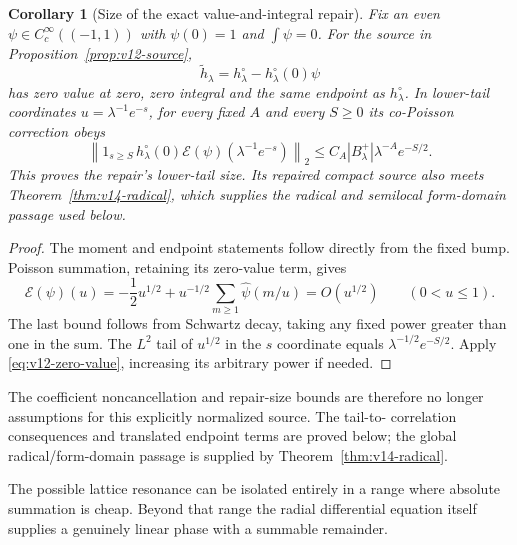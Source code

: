 \documentclass[11pt]{article}
\newtheorem{corollary}[theorem]{Corollary}
\theoremstyle{remark}
\begin{document}
\begin{corollary}[Size of the exact value-and-integral repair]
\label{cor:v12-repair}
Fix an even $\psi\in C_c^\infty((-1,1))$ with $\psi(0)=1$ and
$\int\psi=0$. For the source in Proposition~\ref{prop:v12-source},
\[
 \widetilde h_\lambda=h_\lambda^\circ-h_\lambda^\circ(0)\psi
\]
has zero value at zero, zero integral and the same endpoint as
$h_\lambda^\circ$. In lower-tail coordinates $u=\lambda^{-1}e^{-s}$,
for every fixed $A$ and every $S\ge0$ its co-Poisson correction obeys
\begin{equation}\label{eq:v12-repair-tail}
 \left\|1_{s\ge S}\,h_\lambda^\circ(0)
            \mathcal E(\psi)(\lambda^{-1}e^{-s})\right\|_2
     \le C_A |B_\lambda^+|\lambda^{-A}e^{-S/2}.
\end{equation}
This proves the repair's lower-tail size. Its repaired compact source
also meets Theorem~\ref{thm:v14-radical}, which supplies the radical and
semilocal form-domain passage used below.
\end{corollary}
\begin{proof}
The moment and endpoint statements follow directly from the fixed bump.
Poisson summation, retaining its zero-value term, gives
\[
 \mathcal E(\psi)(u)=-\frac12u^{1/2}
           +u^{-1/2}\sum_{m\ge1}\widehat\psi(m/u)=O(u^{1/2})
       \qquad(0<u\le1).
\]
The last bound follows from Schwartz decay, taking any fixed power
greater than one in the sum. The $L^2$ tail of $u^{1/2}$ in the
$s$ coordinate equals $\lambda^{-1/2}e^{-S/2}$. Apply
\eqref{eq:v12-zero-value}, increasing its arbitrary power if needed.
\end{proof}

The coefficient noncancellation and repair-size bounds are therefore no
longer assumptions for this explicitly normalized source. The tail-to-
correlation consequences and translated endpoint terms are proved below;
the global radical/form-domain passage is supplied by
Theorem~\ref{thm:v14-radical}.


The possible lattice resonance can be isolated entirely in a range where absolute summation is cheap.  Beyond that range the radial differential equation itself supplies a genuinely linear phase with a summable remainder.
\end{document}
